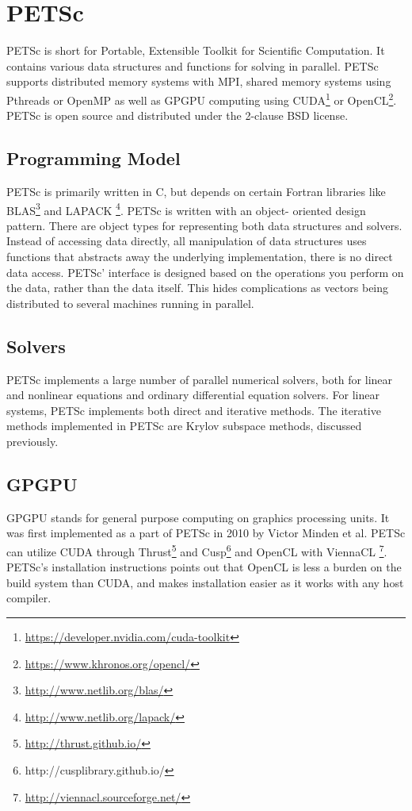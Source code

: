 \section{PETSc}

PETSc is short for Portable, Extensible Toolkit for Scientific Computation. 
It contains various data structures and functions for 
solving  in parallel. PETSc supports distributed 
memory systems with MPI, shared memory systems using Pthreads or OpenMP as well 
as GPGPU computing using CUDA\footnote{\url{https://developer.nvidia.com/cuda-toolkit}} 
or OpenCL\footnote{\url{https://www.khronos.org/opencl/}}. PETSc is open source and distributed 
under the 2-clause BSD license\cite{petsc-web-page}.

\subsection{Programming Model}

PETSc is primarily written in C, but depends on certain Fortran libraries like 
BLAS\footnote{\url{http://www.netlib.org/blas/}} and LAPACK
\footnote{\url{http://www.netlib.org/lapack/}}. PETSc is written with an object-
oriented design pattern. There are object types for representing both data structures 
and solvers. Instead of accessing data directly, all manipulation of data structures 
uses functions that abstracts away the underlying implementation, there is no direct 
data access. PETSc' interface is designed based on the operations you perform on 
the data, rather than the data itself. This hides complications as vectors being 
distributed to several machines running in parallel.

\subsection{Solvers}

PETSc implements a large number of parallel numerical solvers, both for linear and 
nonlinear equations and ordinary differential equation solvers. For linear systems, 
PETSc implements both direct and iterative methods. The iterative methods implemented 
in PETSc are Krylov subspace methods, discussed previously.

\subsection{GPGPU}

GPGPU stands for general purpose computing on graphics processing units. It was 
first implemented as a part of PETSc in 2010\cite{minden2010preliminary} by Victor 
Minden et al. PETSc can utilize CUDA through Thrust\footnote{\url{http://thrust.github.io/}} 
and Cusp\footnote{http://cusplibrary.github.io/} and OpenCL with ViennaCL
\footnote{\url{http://viennacl.sourceforge.net/}}. PETSc's installation instructions 
points out that OpenCL is less a burden on the build system than CUDA, and makes 
installation easier as it works with any host compiler. 

